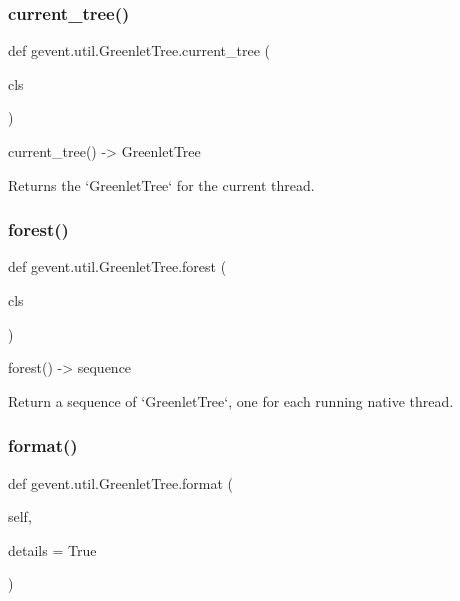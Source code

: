 \subsubsection{\texorpdfstring{current\+\_\+tree()}{current\_tree()}}
{\footnotesize\ttfamily def gevent.\+util.\+Greenlet\+Tree.\+current\+\_\+tree (\begin{DoxyParamCaption}\item[{}]{cls }\end{DoxyParamCaption})}

\begin{DoxyVerb}current_tree() -> GreenletTree

Returns the `GreenletTree` for the current thread.
\end{DoxyVerb}
 \mbox{\label{classgevent_1_1util_1_1_greenlet_tree_a9dd8412218ac48d66385728da4b60b4b}} 
\subsubsection{\texorpdfstring{forest()}{forest()}}
{\footnotesize\ttfamily def gevent.\+util.\+Greenlet\+Tree.\+forest (\begin{DoxyParamCaption}\item[{}]{cls }\end{DoxyParamCaption})}

\begin{DoxyVerb}forest() -> sequence

Return a sequence of `GreenletTree`, one for each running
native thread.
\end{DoxyVerb}
 \mbox{\label{classgevent_1_1util_1_1_greenlet_tree_a243660419ec4364558ef7d126bfb8647}} 
\subsubsection{\texorpdfstring{format()}{format()}}
{\footnotesize\ttfamily def gevent.\+util.\+Greenlet\+Tree.\+format (\begin{DoxyParamCaption}\item[{}]{self,  }\item[{}]{details = {\ttfamily True} }\end{DoxyParamCaption})}

